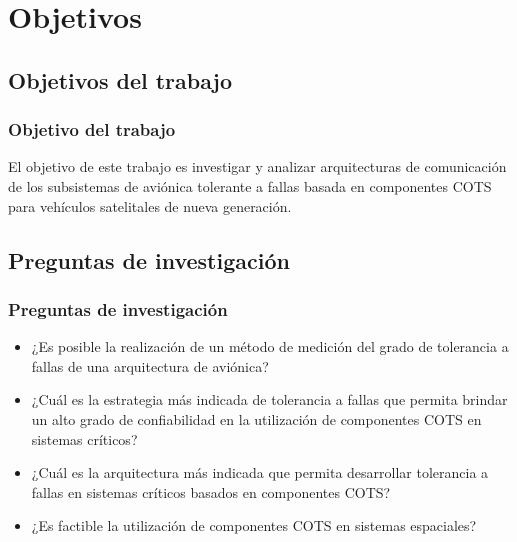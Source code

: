 \section{Objetivos}
\subsection{Objetivos del trabajo}
\begin{frame}
    \frametitle{Objetivo del trabajo}
    El objetivo de este trabajo es investigar y analizar arquitecturas de comunicación de los subsistemas de aviónica tolerante a fallas basada en componentes COTS para vehículos satelitales de nueva generación.
\end{frame}

\subsection{Preguntas de investigación}
\begin{frame}
	\frametitle{Preguntas de investigación}
	\begin{itemize}
		\item ¿Es posible la realización de un método de medición del grado de tolerancia a fallas de una arquitectura de aviónica?
		\item ¿Cuál es la estrategia más indicada de tolerancia a fallas que permita brindar un alto grado de confiabilidad en la utilización de componentes COTS en sistemas críticos?
		\item ¿Cuál es la arquitectura más indicada que permita desarrollar tolerancia a fallas en sistemas críticos basados en componentes COTS?
		\item ¿Es factible la utilización de componentes COTS en sistemas espaciales?
	\end{itemize}
\end{frame}